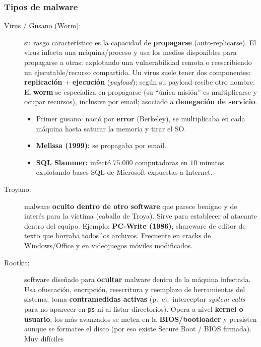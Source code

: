 \documentclass[../main.tex]{subfiles}
\begin{document}
\subsubsection{Tipos de malware}

\begin{description}
  \item[Virus / Gusano (Worm):] su rasgo característico es la capacidad de
        \textbf{propagarse} (auto-replicarse). El virus infecta una máquina/proceso
        y usa los medios disponibles para propagarse a otras: explotando una
        vulnerabilidad remota o reescribiendo un ejecutable/recurso compartido. Un
        virus suele tener dos componentes: \textbf{replicación} + \textbf{ejecución}
        (\textit{payload}); según su payload recibe otro nombre. El \textbf{worm}
        se especializa en propagarse (su ``única misión'' es multiplicarse y ocupar
        recursos), inclusive por email; asociado a \textbf{denegación de servicio}.
        \begin{itemize}[noitemsep]
          \item Primer gusano: nació por \textbf{error} (Berkeley), se multiplicaba
                en cada máquina hasta saturar la memoria y tirar el SO.
          \item \textbf{Melissa (1999):} se propagaba por email.
          \item \textbf{SQL Slammer:} infectó $75.000$ computadoras en $10$ minutos
                explotando bases SQL de Microsoft expuestas a Internet.
        \end{itemize}
  \item[Troyano:] malware \textbf{oculto dentro de otro software} que parece
        benigno y de interés para la víctima (caballo de Troya). Sirve para
        establecer al atacante dentro del equipo. Ejemplo: \textbf{PC-Write (1986)},
        shareware de editor de texto que borraba todos los archivos. Frecuente en
        cracks de Windows/Office y en videojuegos móviles modificados.
  \item[Rootkit:] software diseñado para \textbf{ocultar} malware dentro de la
        máquina infectada. Usa ofuscación, encripción, reescritura y reemplazo de
        herramientas del sistema; toma \textbf{contramedidas activas} (p.\ ej.\
        interceptar \textit{system calls} para no aparecer en \texttt{ps} ni al
        listar directorios). Opera a nivel \textbf{kernel o usuario}; los más
        avanzados se meten en la \textbf{BIOS/bootloader} y persisten aunque se
        formatee el disco (por eso existe Secure Boot / BIOS firmada). Muy difíciles

\end{description}
\end{document}
